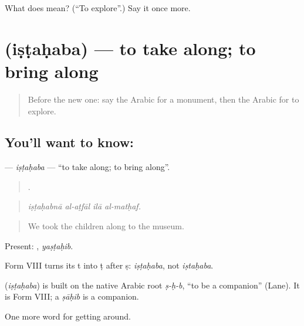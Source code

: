 \begin{tcolorbox}[breakable,colback=teal!4,colframe=teal!35!black,title={Before you move on}]
What does  mean? (\textquotedblleft{}To explore\textquotedblright{}.) Say it once more.
\end{tcolorbox}
\section[\texorpdfstring{\ar{اصطحب} (iṣṭaḥaba)}{اصطحب (iṣṭaḥaba)}]{ (iṣṭaḥaba) — to take along; to bring along}

\label{lesson:AR-C439-istahaba}



\begin{quote}
Before the new one: say the Arabic for a monument, then the Arabic for to explore.
\end{quote}

\subsection*{You'll want to know: }
\textbf{} — \emph{iṣṭaḥaba} — \textquotedblleft{}to take along; to bring along\textquotedblright{}.

\begin{quote}
   .
\end{quote}

\begin{quote}
\emph{iṣṭaḥabnā al-aṭfāl ilā al-matḥaf.}
\end{quote}

\begin{quote}
We took the children along to the museum.
\end{quote}

Present: , \emph{yaṣṭaḥib}.

Form VIII turns its t into ṭ after ṣ: \emph{iṣṭaḥaba}, not \emph{iṣtaḥaba}.

\begin{cousinweb}
\textbf{} (\emph{iṣṭaḥaba}) is built on the native Arabic root \emph{ṣ-ḥ-b}, \textquotedblleft{}to be a companion\textquotedblright{} (Lane). It is Form VIII; a \emph{ṣāḥib} is a companion.
\end{cousinweb}

\begin{grammarlens}[title={What you've built}]
One more word for getting around.
\end{grammarlens}

